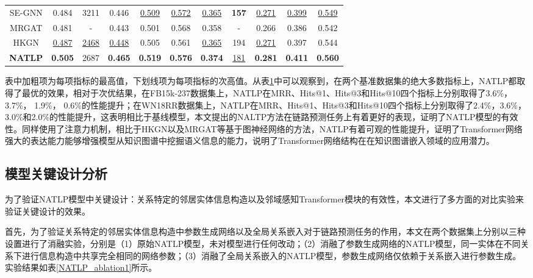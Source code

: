 \begin{table}[htbp]
\begin{center}
\begin{tabular}{*{11}{c}}
          SE-GNN&0.484&3211&0.446&	\underline{0.509}&	\underline{0.572}	&\underline{0.365}& \textbf{157}	&\underline{0.271}	&\underline{0.399}	&\underline{0.549}\\
          MRGAT&0.481&-&0.443&0.501&0.568&0.358	&-&0.266&0.386&0.542\\
          HKGN&\underline{0.487}&\underline{2468}&\underline{0.448}&0.505&0.561&\underline{0.365}&194&\underline{0.271}&0.397&0.544\\
          \cmidrule{1-11}
          \textbf{NATLP}&\textbf{0.505}&2687&\textbf{0.465}&\textbf{0.519}&\textbf{0.576}&\textbf{0.374}&\underline{181}&\textbf{0.281}&\textbf{0.411}&\textbf{0.560}\\
          \bottomrule
      \end{tabular}
      \label{NATLP_result_tab}
  \end{center}
\end{table}

表中加粗项为每项指标的最高值，下划线项为每项指标的次高值。从表\ref{NATLP_result_tab}中可以观察到，在两个基准数据集的绝大多数指标上，NATLP都取得了最优的效果，相对于次优结果，在FB15k-237数据集上，NATLP在MRR、Hits@1、Hits@3和Hits@10四个指标上分别取得了3.6\%，3.7\%， 1.9\%， 0.6\%的性能提升；在WN18RR数据集上，NATLP在MRR、Hits@1、Hits@3和Hits@10四个指标上分别取得了2.4\%，3.6\%， 3.0\%和2.0\%的性能提升，这表明相比于基线模型，本文提出的NALTP方法在链路预测任务上有着更好的表现，证明了NATLP模型的有效性。同样使用了注意力机制，相比于HKGN以及MRGAT等基于图神经网络的方法，NATLP有着可观的性能提升，证明了Transformer网络强大的表达能力能够增强模型从知识图谱中挖掘语义信息的能力，说明了Transformer网络结构在在知识图谱嵌入领域的应用潜力。

\subsection{模型关键设计分析}

为了验证NATLP模型中关键设计：关系特定的邻居实体信息构造以及邻域感知Transformer模块的有效性，本文进行了多方面的对比实验来验证关键设计的效果。

首先，为了验证关系特定的邻居实体信息构造中参数生成网络以及全局关系嵌入对于链路预测任务的作用，本文在两个数据集上分别以三种设置进行了消融实验，分别是（1）原始NATLP模型，未对模型进行任何改动；（2）消融了参数生成网络的NATLP模型，同一实体在不同关系下进行信息构造中共享完全相同的网络参数；（3）消融了全局关系嵌入的NATLP模型，参数生成网络仅依赖于关系嵌入进行参数生成。实验结果如表\ref{NATLP_ablation1}所示。

